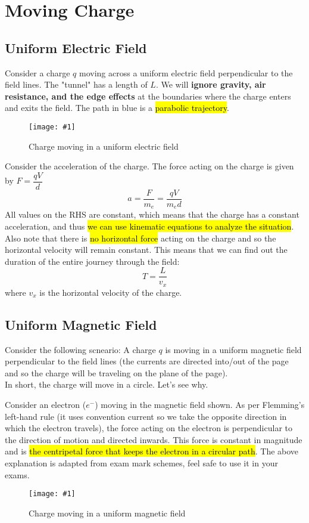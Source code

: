 \documentclass[a4paper,12pt]{article}
\let\oldsection\section
\renewcommand\section{\clearpage\oldsection}
\newcommand{\lb}{\\[8pt]}
\newcommand{\img}[4]{\begin{center}
  \begin{figure}[H]
    \centering
    \texttt{[image: \#1]}
    \caption{#3}
    \label{fig:#4}
  \end{figure}
\end{center}}
\begin{document}
\section{Moving Charge}

\subsection{Uniform Electric Field}

Consider a charge $q$ moving across a uniform electric field perpendicular to the field lines. The "tunnel" has a length of $L$. We will \textbf{ignore gravity, air resistance, and the edge effects} at the boundaries where the charge enters and exits the field. The path in blue is a \hl{parabolic trajectory}.
\img{move1.png}{0.7}{Charge moving in a uniform electric field}{move1}

Consider the acceleration of the charge. The force acting on the charge is given by $F = \dfrac{qV}{d}$
$$a = \frac{F}{m_e} = \frac{qV}{m_ed}$$
All values on the RHS are constant, which means that the charge has a constant acceleration, and thus \hl{we can use kinematic equations to analyze the situation}.\lb
Also note that there is \hl{no horizontal force} acting on the charge and so the horizontal velocity will remain constant. This means that we can find out the duration of the entire journey through the field:
$$T = \frac{L}{v_x}$$
where $v_x$ is the horizontal velocity of the charge.


\subsection{Uniform Magnetic Field}\label{subsec:uniformmagneticfield}
Consider the following scneario: A charge $q$ is moving in a uniform magnetic field perpendicular to the field lines (the currents are directed into/out of the page and so the charge will be traveling on the plane of the page).\lb
In short, the charge will move in a circle. Let's see why.\lb

\begin{minipage}[t]
  {0.6\textwidth}
  Consider an electron ($e^-$) moving in the magnetic field shown. As per Flemming's left-hand rule (it uses convention current so we take the opposite direction in which the electron travels), the force acting on the electron is perpendicular to the direction of motion and directed inwards. This force is constant in magnitude and is \hl{the centripetal force that keeps the electron in a circular path}. The above explanation is adapted from exam mark schemes, feel safe to use it in your exams.
\end{minipage}\hspace*{0.05\textwidth}%
\begin{minipage}[t]
  {0.35\textwidth}
  \img{move2.png}{1}{Charge moving in a uniform magnetic field}{move2}
\end{minipage}
\end{document}
